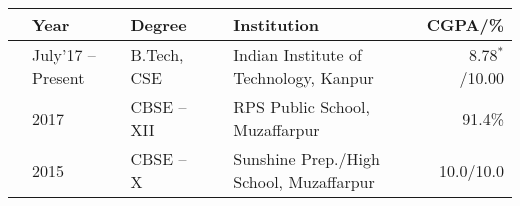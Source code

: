 
\newcommand{\education}[4]{
  & #1 & #2 & &#3 & #4
}
\begin{tabular}{ | L{0.05cm} l | L{3cm} | L{0.05cm} C{8cm} | r |}
  \hline
  \education{\textbf{Year}}{\textbf{Degree}}{\textbf{Institution}}{\textbf{CGPA/\%}}\\
  \hline
  \education{July'17 -- Present}{B.Tech, CSE}{Indian Institute of Technology, Kanpur}{8.78$^{*}$/10.00}\\
  \education{2017}{CBSE -- XII}{RPS Public School, Muzaffarpur}{91.4\%}\\
  \education{2015}{CBSE -- X}{Sunshine Prep./High School, Muzaffarpur}{10.0/10.0}\\
  \hline
\end{tabular}

